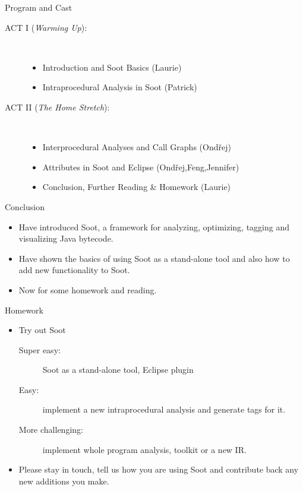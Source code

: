 \begin{slide}{Program and Cast}
\begin{description}
\item[ACT I ({\em Warming Up}):] \hspace{1in} \\
\begin{itemize}
\item Introduction and Soot Basics {\blue (Laurie)}
\item Intraprocedural Analysis in Soot {\blue (Patrick)}
\end{itemize}
\item[ACT II ({\em The Home Stretch}):] \hspace{1in} \\
\begin{itemize}
\item Interprocedural Analyses and Call Graphs {\blue (Ond\v{r}ej)}
\item Attributes in Soot and Eclipse {\blue (Ond\v{r}ej,Feng,Jennifer)}
\item {\red Conclusion, Further Reading \& Homework {\blue (Laurie)}}
\end{itemize}
\end{description}
\end{slide}

\begin{slide}{Conclusion}
\begin{itemize}
\item Have introduced Soot, a framework for analyzing, optimizing, tagging
and visualizing Java bytecode.
\item Have shown the basics of using Soot as a stand-alone tool and also
how to add new functionality to Soot.
\item Now for some homework and reading.
\end{itemize}
\end{slide}

\begin{slide}{Homework}
\begin{itemize}
\item Try out Soot
\begin{description}
\item[Super easy:]  Soot as a stand-alone tool,  Eclipse plugin
\item [Easy:]  implement a new intraprocedural analysis and
                 generate tags for it.  
\item [More challenging:]  implement whole program analysis,  toolkit or a
new IR.
\end{description}

\item Please stay in touch, tell us how you are using Soot and
contribute back any new additions you make.
\end{itemize}
\end{slide}

